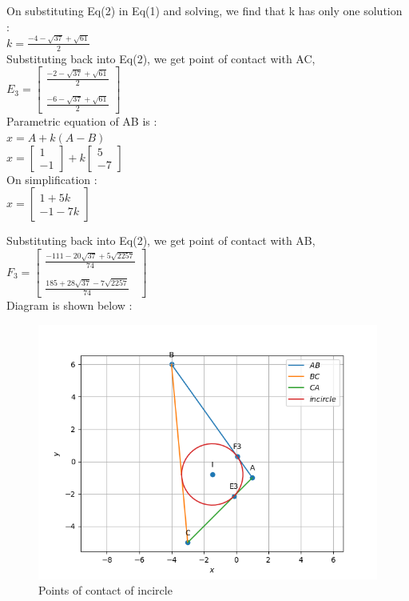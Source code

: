 \documentclass[journal,12pt,twocolumn]{IEEEtran}
\theoremstyle{remark}
\begin{document}
\begin{flushleft}
	\bigskip
	On substituting Eq(2) in Eq(1) and solving, we find that k has only one solution :\\
	\bigskip
	$k = \frac{-4-\sqrt{37}+\sqrt{61}}{2}$\\
	\bigskip
	Substituting back into Eq(2), we get point of contact with AC,\\
	\bigskip
	${E}_3 = \begin{bmatrix}
		\frac{-2-\sqrt{37}+\sqrt{61}}{2}\\ \\
		\frac{-6-\sqrt{37}+\sqrt{61}}{2}
	\end{bmatrix}$\\
	\bigskip
	Parametric equation of AB is : \\
	\bigskip
	$x = A + k(A-B)$\\
	\bigskip
	$x = \begin{bmatrix}
		1\\
		-1
	\end{bmatrix}
	+ k\begin{bmatrix}
		5\\
		-7
	\end{bmatrix}$\\
	\bigskip
	On simplification :\\
	\bigskip
	$x = \begin{bmatrix}
		1+5k\\
		-1-7k
	\end{bmatrix}$\\
	\bigskip

	Substituting back into Eq(2), we get point of contact with AB,\\
	\bigskip
	${F}_3 = \begin{bmatrix}
		\frac{-111-20\sqrt{37}+5\sqrt{2257}}{74}\\ \\
		\frac{185+28\sqrt{37}-7\sqrt{2257}}{74}
	\end{bmatrix}$\\
	\bigskip
	Diagram is shown below :\\

\end{flushleft}

\begin{figure}[h]
	\centering
	\includegraphics[width=\columnwidth]{./Diagram.png}
	\caption{Points of contact of incircle}
	\label{Incircle}
\end{figure}
\end{document}
